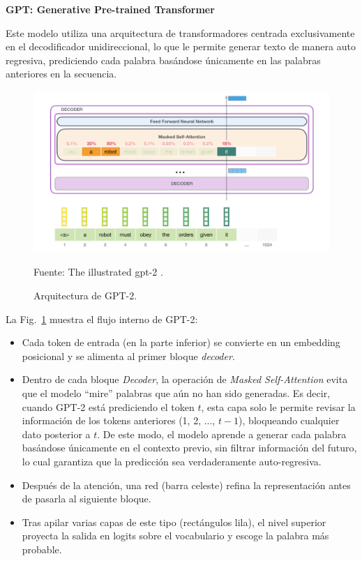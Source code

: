 \newpage
\textbf{GPT: Generative Pre-trained Transformer}

Este modelo utiliza una arquitectura de transformadores centrada exclusivamente en el decodificador unidireccional, lo que le permite generar texto de manera auto regresiva, prediciendo cada palabra basándose únicamente en las palabras anteriores en la secuencia.

\begin{figure}[H]
  \centering
  \includegraphics[width=0.8\linewidth]{Imagenes/gpt mascara de atencion.png}
  \caption{Arquitectura de GPT-2.}
  Fuente: The illustrated gpt-2 \cite{alammar2018gpt2}.
  \label{fig:gpt2_flow}
\end{figure}


La Fig.~\ref{fig:gpt2_flow} muestra el flujo interno de GPT-2:
\begin{itemize}
  \item Cada token de entrada (en la parte inferior) se convierte en un embedding posicional y se alimenta al primer bloque \emph{decoder}.
    \item Dentro de cada bloque \emph{Decoder}, la operación de \emph{Masked Self-Attention} evita que el modelo “mire” palabras que aún no han sido generadas. Es decir, cuando GPT-2 está prediciendo el token $t$, esta capa solo le permite revisar la información de los tokens anteriores (1, 2, ..., $t-1$), bloqueando cualquier dato posterior a $t$. De este modo, el modelo aprende a generar cada palabra basándose únicamente en el contexto previo, sin filtrar información del futuro, lo cual garantiza que la predicción sea verdaderamente auto-regresiva.

  \item Después de la atención, una red (barra celeste) refina la representación antes de pasarla al siguiente bloque.
  \item Tras apilar varias capas de este tipo (rectángulos lila), el nivel superior proyecta la salida en logits sobre el vocabulario y escoge la palabra más probable.  
\end{itemize}

